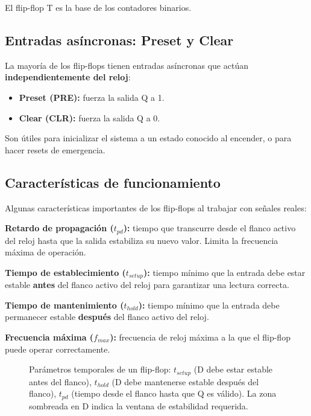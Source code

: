 El flip-flop T es la base de los contadores binarios.

\subsection{Entradas asíncronas: Preset y Clear}

La mayoría de los flip-flops tienen entradas asíncronas que actúan \textbf{independientemente del reloj}:

\begin{itemize}
    \item \textbf{Preset (PRE):} fuerza la salida Q a 1.
    \item \textbf{Clear (CLR):} fuerza la salida Q a 0.
\end{itemize}

Son útiles para inicializar el sistema a un estado conocido al encender, o para hacer resets de emergencia.

\subsection{Características de funcionamiento}

Algunas características importantes de los flip-flops al trabajar con señales reales:

\textbf{Retardo de propagación ($t_{pd}$):} tiempo que transcurre desde el flanco activo del reloj hasta que la salida estabiliza su nuevo valor. Limita la frecuencia máxima de operación.

\textbf{Tiempo de establecimiento ($t_{setup}$):} tiempo mínimo que la entrada debe estar estable \textbf{antes} del flanco activo del reloj para garantizar una lectura correcta.

\textbf{Tiempo de mantenimiento ($t_{hold}$):} tiempo mínimo que la entrada debe permanecer estable \textbf{después} del flanco activo del reloj.

\textbf{Frecuencia máxima ($f_{max}$):} frecuencia de reloj máxima a la que el flip-flop puede operar correctamente.

\begin{figure}[H]
\centering

\caption{Parámetros temporales de un flip-flop: $t_{setup}$ (D debe estar estable antes del flanco),
  $t_{hold}$ (D debe mantenerse estable después del flanco),
  $t_{pd}$ (tiempo desde el flanco hasta que Q es válido).
  La zona sombreada en D indica la ventana de estabilidad requerida.}
\end{figure}

